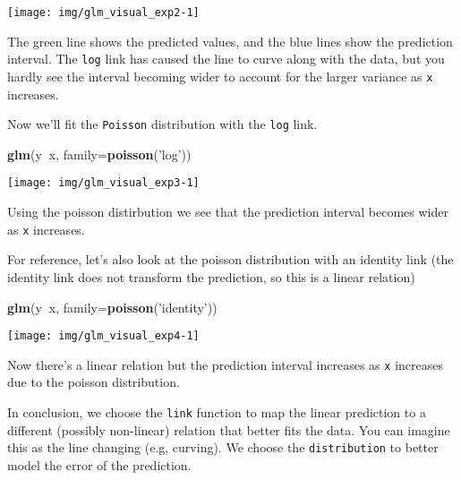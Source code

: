 \documentclass[
]{article}
\newenvironment{Shaded}{\begin{snugshade}}{\end{snugshade}}
\newcommand{\DataTypeTok}[1]{\textcolor[rgb]{0.13,0.29,0.53}{#1}}
\newcommand{\KeywordTok}[1]{\textcolor[rgb]{0.13,0.29,0.53}{\textbf{#1}}}
\newcommand{\NormalTok}[1]{#1}
\newcommand{\OperatorTok}[1]{\textcolor[rgb]{0.81,0.36,0.00}{\textbf{#1}}}
\newcommand{\StringTok}[1]{\textcolor[rgb]{0.31,0.60,0.02}{#1}}
\begin{document}
\begin{center}\texttt{[image: img/glm\_visual\_exp2-1]} \end{center}

The green line shows the predicted values, and the blue lines show the
prediction interval. The \texttt{log} link has caused the line to curve
along with the data, but you hardly see the interval becoming wider to
account for the larger variance as \texttt{x} increases.

Now we'll fit the \texttt{Poisson} distribution with the \texttt{log}
link.

\begin{Shaded}
\begin{Highlighting}[]
\KeywordTok{glm}\NormalTok{(y}\OperatorTok{~}\NormalTok{x, }\DataTypeTok{family=}\KeywordTok{poisson}\NormalTok{(}\StringTok{'log'}\NormalTok{))}
\end{Highlighting}
\end{Shaded}

\begin{center}\texttt{[image: img/glm\_visual\_exp3-1]} \end{center}

Using the poisson distirbution we see that the prediction interval
becomes wider as \texttt{x} increases.

For reference, let's also look at the poisson distribution with an
identity link (the identity link does not transform the prediction, so
this is a linear relation)

\begin{Shaded}
\begin{Highlighting}[]
\KeywordTok{glm}\NormalTok{(y}\OperatorTok{~}\NormalTok{x, }\DataTypeTok{family=}\KeywordTok{poisson}\NormalTok{(}\StringTok{'identity'}\NormalTok{))}
\end{Highlighting}
\end{Shaded}

\begin{center}\texttt{[image: img/glm\_visual\_exp4-1]} \end{center}

Now there's a linear relation but the prediction interval increases as
\texttt{x} increases due to the poisson distribution.

In conclusion, we choose the \texttt{link} function to map the linear
prediction to a different (possibly non-linear) relation that better
fits the data. You can imagine this as the line changing (e.g, curving).
We choose the \texttt{distribution} to better model the error of the
prediction.
\end{document}
